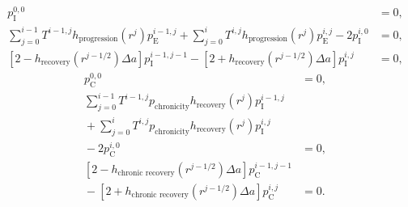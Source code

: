 \documentclass[12pt]{article}
\begin{document}
\begin{equation}
  \begin{split}
    p_{\mathrm{I}}^{0, 0} &= 0,
    \\
    \sum_{j = 0}^{i - 1}
    T^{i - 1, j} h_{\text{progression}}(r^j) p_{\mathrm{E}}^{i - 1, j}
    + \sum_{j = 0}^i
    T^{i, j} h_{\text{progression}}(r^j) p_{\mathrm{E}}^{i, j}
    - 2 p_{\mathrm{I}}^{i, 0}
    &= 0,
    \\
    \left[2 - h_{\text{recovery}}(r^{j - 1 / 2}) \Delta a\right]
    p_{\mathrm{I}}^{i - 1, j - 1}
    - \left[2 + h_{\text{recovery}}(r^{j - 1 / 2}) \Delta a\right]
    p_{\mathrm{I}}^{i, j}
    &= 0,
  \end{split}
\end{equation}
\begin{equation}
  \begin{split}
    p_{\mathrm{C}}^{0, 0} &= 0,
    \\
    \sum_{j = 0}^{i - 1}
    T^{i - 1, j} p_{\text{chronicity}} h_{\text{recovery}}(r^j)
    p_{\mathrm{I}}^{i - 1, j}
    \\ {}
    + \sum_{j = 0}^i
    T^{i, j} p_{\text{chronicity}} h_{\text{recovery}}(r^j)
    p_{\mathrm{I}}^{i, j}
    \\ {}
    - 2 p_{\mathrm{C}}^{i, 0}
    &= 0,
    \\
    \left[2 - h_{\text{chronic recovery}}(r^{j - 1 / 2}) \Delta a\right]
    p_{\mathrm{C}}^{i - 1, j - 1}
    \\ {}
    - \left[2 + h_{\text{chronic recovery}}(r^{j - 1 / 2}) \Delta a\right]
    p_{\mathrm{C}}^{i, j}
    &= 0.
  \end{split}
\end{equation}



\end{document}
